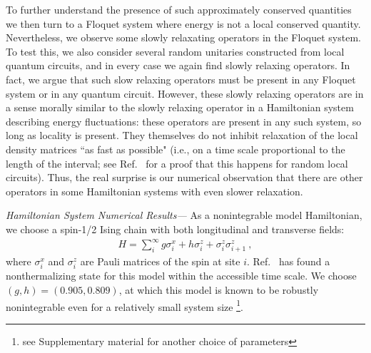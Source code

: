 \documentclass[twocolumn,superscriptaddress, prb]{revtex4-1}
\begin{document}
To further understand the presence of such approximately conserved quantities we then turn to a Floquet system where energy is not a local conserved quantity.
Nevertheless, we observe some slowly relaxating operators in the Floquet system.
To test this, we also consider several random unitaries constructed from local quantum circuits, and in every case we again find slowly relaxing operators.
In fact, we argue that such slow relaxing operators must be present in any Floquet system or in any quantum circuit.  However, these slowly relaxing operators are in a sense morally similar to the slowly relaxing operator in a Hamiltonian system describing energy fluctuations: these operators are present in any such system, so long as locality is present.  They themselves do not inhibit relaxation of the local density matrices ``as fast as possible" (i.e., on a time scale proportional to the length of the interval; see Ref.~ for a proof that this happens for random local circuits).  Thus, the real surprise is our numerical observation that there are other operators in some Hamiltonian systems with even slower relaxation.


{\it Hamiltonian System Numerical Results---}
As a nonintegrable model Hamiltonian, we choose a spin-1/2 Ising chain with both longitudinal and transverse fields:
\begin{align}
H = \sum_{i}^{\infty} g\sigma^x_i + h\sigma^z_i + \sigma^z_i \sigma^z_{i+1} ~,
\label{eq:Hamiltonian}
\end{align}
where $\sigma^x_i$ and $\sigma^z_i$ are Pauli matrices of the spin at site $i$.
Ref.~ has found a nonthermalizing state for this model within the accessible time scale.
We choose $(g,h) = (0.905, 0.809)$, at which this model is known to be robustly nonintegrable even for a relatively small system size \cite{Kim:2013}
\footnote{see Supplementary material for another choice of parameters}. 
\end{document}
